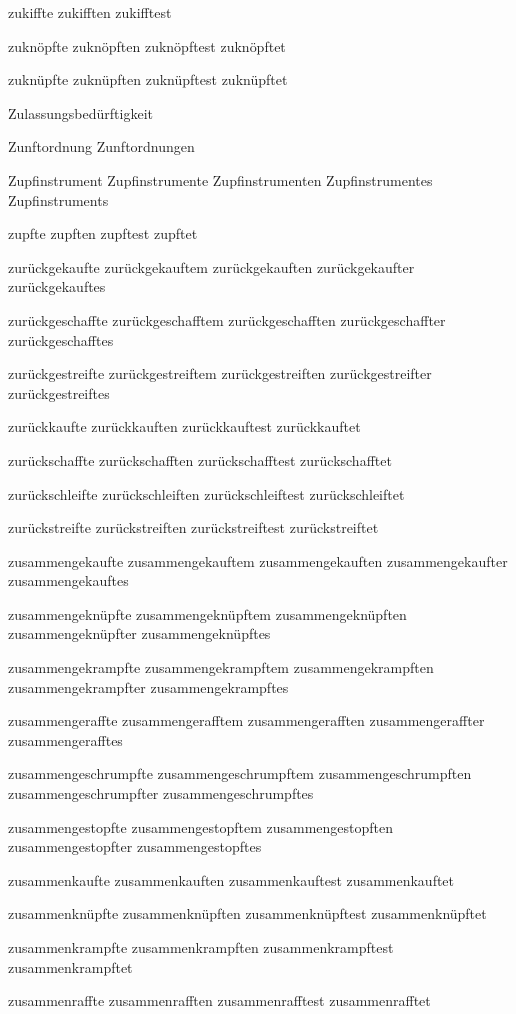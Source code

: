 zukiffte
zukifften
zukifftest

zuknöpfte
zuknöpften
zuknöpftest
zuknöpftet

zuknüpfte
zuknüpften
zuknüpftest
zuknüpftet

Zulassungsbedürftigkeit

Zunftordnung
Zunftordnungen

Zupfinstrument
Zupfinstrumente
Zupfinstrumenten
Zupfinstrumentes
Zupfinstruments

zupfte
zupften
zupftest
zupftet

zurückgekaufte
zurückgekauftem
zurückgekauften
zurückgekaufter
zurückgekauftes

zurückgeschaffte
zurückgeschafftem
zurückgeschafften
zurückgeschaffter
zurückgeschafftes

zurückgestreifte
zurückgestreiftem
zurückgestreiften
zurückgestreifter
zurückgestreiftes

zurückkaufte
zurückkauften
zurückkauftest
zurückkauftet

zurückschaffte
zurückschafften
zurückschafftest
zurückschafftet

zurückschleifte
zurückschleiften
zurückschleiftest
zurückschleiftet

zurückstreifte
zurückstreiften
zurückstreiftest
zurückstreiftet

zusammengekaufte
zusammengekauftem
zusammengekauften
zusammengekaufter
zusammengekauftes

zusammengeknüpfte
zusammengeknüpftem
zusammengeknüpften
zusammengeknüpfter
zusammengeknüpftes

zusammengekrampfte
zusammengekrampftem
zusammengekrampften
zusammengekrampfter
zusammengekrampftes

zusammengeraffte
zusammengerafftem
zusammengerafften
zusammengeraffter
zusammengerafftes

zusammengeschrumpfte
zusammengeschrumpftem
zusammengeschrumpften
zusammengeschrumpfter
zusammengeschrumpftes

zusammengestopfte
zusammengestopftem
zusammengestopften
zusammengestopfter
zusammengestopftes

zusammenkaufte
zusammenkauften
zusammenkauftest
zusammenkauftet

zusammenknüpfte
zusammenknüpften
zusammenknüpftest
zusammenknüpftet

zusammenkrampfte
zusammenkrampften
zusammenkrampftest
zusammenkrampftet

zusammenraffte
zusammenrafften
zusammenrafftest
zusammenrafftet

